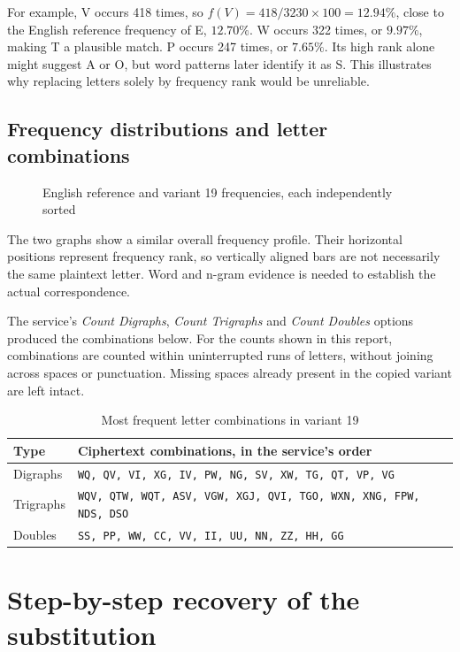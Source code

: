 \documentclass{tum_report}
\begin{document}
For example, V occurs 418 times, so $f(V)=418/3230\times100=12.94\%$,
close to the English reference frequency of E, $12.70\%$. W occurs
322 times, or $9.97\%$, making T a plausible match. P occurs
247 times, or $7.65\%$. Its high rank alone might suggest A or O, but
word patterns later identify it as S. This illustrates why replacing
letters solely by frequency rank would be unreliable.

\clearpage
\section{Frequency distributions and letter combinations}
\begin{figure}[H]\centering

\caption{English reference and variant 19 frequencies, each independently sorted}
\label{fig:frequencies}\end{figure}

The two graphs show a similar overall frequency profile. Their horizontal
positions represent frequency rank, so vertically aligned bars are not
necessarily the same plaintext letter. Word and n-gram evidence is needed
to establish the actual correspondence.

The service's \textit{Count Digraphs}, \textit{Count Trigraphs} and
\textit{Count Doubles} options produced the combinations below. For the
counts shown in this report, combinations are counted within uninterrupted
runs of letters, without joining across spaces or punctuation. Missing
spaces already present in the copied variant are left intact.

\begin{table}[H]\caption{Most frequent letter combinations in variant 19}
\centering\small
\begin{tabular}{l p{}}\toprule
Type & Ciphertext combinations, in the service's order\\\midrule
Digraphs & \texttt{WQ, QV, VI, XG, IV, PW, NG, SV, XW, TG, QT, VP, VG}\\
Trigraphs & \texttt{WQV, QTW, WQT, ASV, VGW, XGJ, QVI, TGO, WXN, XNG, FPW, NDS, DSO}\\
Doubles & \texttt{SS, PP, WW, CC, VV, II, UU, NN, ZZ, HH, GG}\\\bottomrule
\end{tabular}\end{table}

\clearpage
\chapter{Step-by-step recovery of the substitution}
\end{document}
